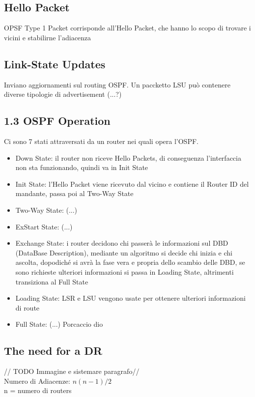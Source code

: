 \documentclass[12pt, a4paper]{article}
\begin{document}
	\subsection*{Hello Packet}
	OPSF Type 1 Packet corrisponde all'Hello Packet, che hanno lo scopo di trovare i vicini e stabilirne l'adiacenza
	\subsection*{Link-State Updates}
	Inviano aggiornamenti sul routing OSPF. Un paccketto LSU può contenere diverse tipologie di advertisement (...?)
	
	
	\subsection*{1.3 OSPF Operation}

	Ci sono 7 stati attraversati da un router nei quali opera l'OSPF.
	\begin{itemize}
		\item Down State: il router non riceve Hello Packets, di conseguenza l'interfaccia non sta funzionando, quindi va in Init State
		\item Init State: l'Hello Packet viene ricevuto dal vicino e contiene il Router ID del mandante, passa poi al Two-Way State
		\item Two-Way State: (...)
		\item ExStart State: (...)
		\item Exchange State: i router decidono chi passerà le informazioni sul DBD (DataBase Description), mediante un algoritmo si decide chi inizia e chi ascolta, dopodiché si avrà la fase vera e propria dello scambio delle DBD, se sono richieste ulteriori informazioni si passa in Loading State, altrimenti transiziona al Full State
		\item Loading State: LSR e LSU vengono usate per ottenere ulteriori informazioni di route
		\item Full State: (...) Porcaccio dio
	\end{itemize}

	\subsection*{The need for a DR}
	// TODO Immagine e sistemare paragrafo// \\
	Numero di Adiacenze: $ n(n - 1) / 2 $ \\
	n = numero di routers \\
	
\end{document}

